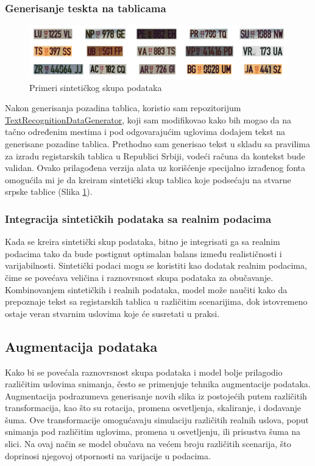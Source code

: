\documentclass[a4paper,12pt]{article}
\begin{document}
	\subsubsection{Generisanje teskta na tablicama}
	\begin{figure}[H]
		\centering
		\includegraphics[width=\textwidth]{assets/synthetic-license-plates.png}
		\caption{Primeri sintetičkog skupa podataka}
		\label{fig:synthetic-license-plates}
	\end{figure}
	
	Nakon generisanja pozadina tablica, koristio sam repozitorijum \href{https://github.com/Belval/TextRecognitionDataGenerator}{TextRecognitionDataGenerator}, koji sam modifikovao kako bih mogao da na tačno određenim mestima i pod odgovarajućim uglovima dodajem tekst na generisane pozadine tablica. Prethodno sam generisao tekst u skladu sa pravilima za izradu registarskih tablica u Republici Srbiji, vodeći računa da kontekst bude validan. Ovako prilagođena verzija alata uz korišćenje specijalno izrađenog fonta omogućila mi je da kreiram sintetički skup tablica koje podsećaju na stvarne srpske tablice (Slika \ref{fig:synthetic-license-plates}).
	
	\subsubsection{Integracija sintetičkih podataka sa realnim podacima}
	Kada se kreira sintetički skup podataka, bitno je integrisati ga sa realnim podacima tako da bude postignut optimalan balans između realističnosti i varijabilnosti. Sintetički podaci mogu se koristiti kao dodatak realnim podacima, čime se povećava veličina i raznovrsnost skupa podataka za obučavanje. Kombinovanjem sintetičkih i realnih podataka, model može naučiti kako da prepoznaje tekst sa registarskih tablica u različitim scenarijima, dok istovremeno ostaje veran stvarnim uslovima koje će susretati u praksi.
	
	\subsection{Augmentacija podataka}
	Kako bi se povećala raznovrsnost skupa podataka i model bolje prilagodio različitim uslovima snimanja, često se primenjuje tehnika augmentacije podataka. Augmentacija podrazumeva generisanje novih slika iz postojećih putem različitih transformacija, kao što su rotacija, promena osvetljenja, skaliranje, i dodavanje šuma. Ove transformacije omogućavaju simulaciju različitih realnih uslova, poput snimanja pod različitim uglovima, promena u osvetljenju, ili prisustva šuma na slici. Na ovaj način se model obučava na većem broju različitih scenarija, što doprinosi njegovoj otpornosti na varijacije u podacima.
	
\end{document}

